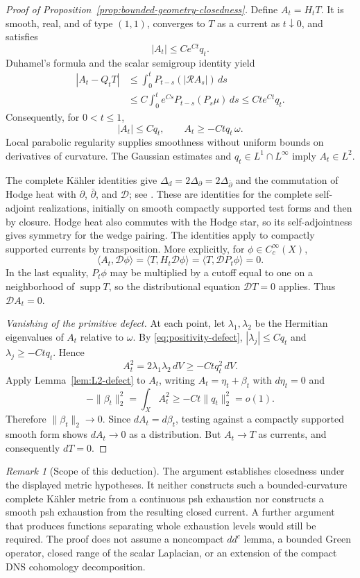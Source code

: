 \documentclass[11pt]{article}
\theoremstyle{remark}
\newtheorem{remark}[theorem]{Remark}
\newcommand{\D}{\mathcal D}
\newcommand{\supp}{\operatorname{supp}}
\begin{document}
\begin{proof}[Proof of Proposition~\ref{prop:bounded-geometry-closedness}]
Define $A_t=H_tT$. It is smooth, real, and of type $(1,1)$, converges
to $T$ as a current as $t\downarrow0$, and satisfies
\[
 |A_t|\leq Ce^{Ct}q_t.
\]
Duhamel's formula and the scalar semigroup identity yield
\begin{align*}
 |A_t-Q_tT|
 &\leq \int_0^t P_{t-s}(|\mathcal R A_s|)\,ds\\
 &\leq C\int_0^t e^{Cs}P_{t-s}(P_s\mu)\,ds
 \leq Cte^{Ct}q_t.
\end{align*}
Consequently, for $0<t\leq1$,
\begin{equation}\label{eq:positivity-defect}
 |A_t|\leq Cq_t,
 \qquad A_t\geq-Ctq_t\,\omega.
\end{equation}
Local parabolic regularity supplies smoothness without uniform
bounds on derivatives of curvature. The Gaussian estimates and
$q_t\in L^1\cap L^\infty$ imply
$A_t\in L^2$.

The complete K\"ahler identities give
$\Delta_d=2\Delta_\partial=2\Delta_{\bar\partial}$ and the
commutation of Hodge heat with $\partial$, $\bar\partial$, and
$\D$; see \cite[\S12]{DemaillyHodge}.
These are identities for the complete self-adjoint realizations,
initially on smooth compactly supported test forms and then by
closure. Hodge heat also commutes with the Hodge star, so its
self-adjointness gives symmetry for the wedge pairing.
The identities apply to compactly supported currents by transposition.
More explicitly, for $\phi\in C_c^\infty(X)$,
\[
 \langle A_t,\D\phi\rangle
 =\langle T,H_t\D\phi\rangle
 =\langle T,\D P_t\phi\rangle=0.
\]
In the last equality, $P_t\phi$ may be multiplied by a cutoff equal
to one on a neighborhood of $\supp T$, so the distributional
equation $\D T=0$ applies. Thus $\D A_t=0$.

\medskip\noindent
\emph{Vanishing of the primitive defect.}
At each point, let $\lambda_1,\lambda_2$ be the Hermitian eigenvalues
of $A_t$ relative to $\omega$. By \eqref{eq:positivity-defect},
$|\lambda_j|\leq Cq_t$ and $\lambda_j\geq-Ctq_t$. Hence
\[
 A_t^2=2\lambda_1\lambda_2\,dV
             \geq-Ctq_t^2\,dV.
\]
Apply Lemma~\ref{lem:L2-defect} to $A_t$, writing
$A_t=\eta_t+\beta_t$ with $d\eta_t=0$ and
\[
 -\|\beta_t\|_2^2=\int_X A_t^2
          \geq-Ct\|q_t\|_2^2=o(1).
\]
Therefore $\|\beta_t\|_2\to0$. Since $dA_t=d\beta_t$, testing
against a compactly supported smooth form shows $dA_t\to0$ as a
distribution. But $A_t\to T$ as currents, and consequently $dT=0$.
\end{proof}

\begin{remark}[Scope of this deduction]
The argument establishes closedness under the displayed metric
hypotheses. It neither constructs such a bounded-curvature complete
K\"ahler metric from a continuous psh exhaustion nor constructs a
smooth psh exhaustion from the resulting closed current. A further
argument that produces functions separating whole exhaustion levels
would still be required. The proof does not assume a noncompact
$dd^c$ lemma, a bounded Green operator, closed range of the scalar
Laplacian, or an extension of the compact DNS cohomology decomposition.
\end{remark}
\end{document}
